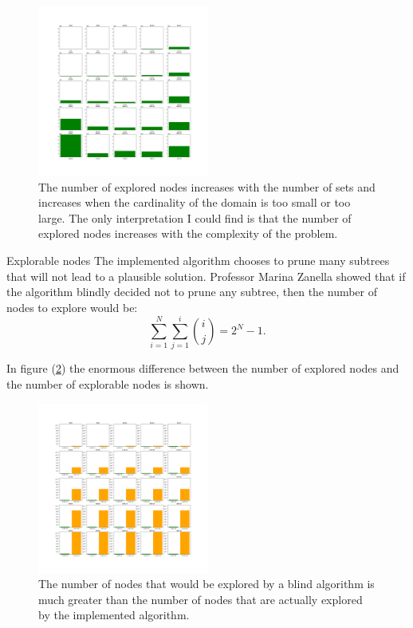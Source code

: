 \documentclass{beamer}
\begin{document}
\begin{frame}
    \begin{figure}
        \centering
        \includegraphics[width=0.5\textwidth]{explored_5x5.pdf}
        \caption{The number of explored nodes increases with the number of sets and increases
        when the cardinality of the domain is too small or too large. The only interpretation
        I could find is that the number of explored nodes increases with the complexity of the problem.}
        \label{fig:explored_5x5}
    \end{figure}
\end{frame}

\begin{frame}{Explorable nodes}
    The implemented algorithm chooses to prune many subtrees
    that will not lead to a plausible solution.
    Professor Marina Zanella showed that if the algorithm blindly decided not to prune any subtree,
    then the number of nodes to explore would be:
    \begin{equation*}
        \sum_{i=1}^{N}\sum_{j=1}^{i}\binom{i}{j} = 2^N-1.
    \end{equation*}

    In figure (\ref{fig:explored_vs_explorable_5x5}) the enormous difference
    between the number of explored nodes and the number of explorable nodes is shown.
\end{frame}

\begin{frame}
    \begin{figure}
        \centering
        \includegraphics[width=0.5\textwidth]{explored_vs_explorable_5x5.pdf}
        \caption{The number of nodes that would be explored by a blind algorithm is
        much greater than the number of nodes that are actually explored by the implemented algorithm.}
        \label{fig:explored_vs_explorable_5x5}
    \end{figure}
\end{frame}
\end{document}
